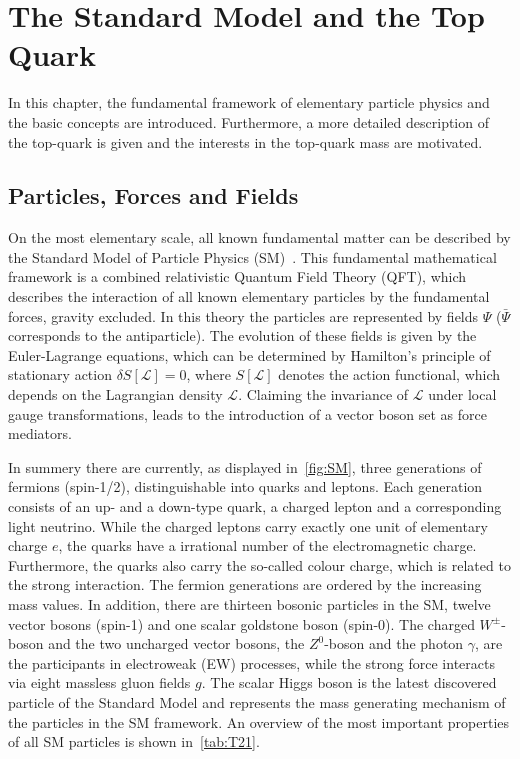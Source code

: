 \chapter{The Standard Model and the Top Quark}
\label{sec:SM1}
In this chapter, the fundamental framework of elementary particle physics and the basic concepts are introduced. Furthermore, a more detailed  description of the top-quark is given and the interests in the top-quark mass are motivated.  

\section{Particles, Forces and Fields}\label{key:SM 2}


\clearpage


On the most elementary scale, all known fundamental matter can be described by the Standard Model of Particle Physics (SM)~\cite{Glashow:1961tr,Glashow:1970gm,Gross:1973ju,Politzer:1973fx,Politzer:1974fr,Salam:1964ry,Weinberg:1967tq}. This fundamental mathematical framework is a combined relativistic Quantum Field Theory (QFT), which describes the interaction of all known elementary particles by the fundamental forces, gravity excluded.
In this theory the particles are represented by fields $\Psi$ ($\bar{\Psi}$  corresponds to the antiparticle). The evolution of these fields is given by the Euler-Lagrange equations, which can be determined by Hamilton's principle of stationary action $\delta S[\mathscr{L}] \!= 0 $, where $S[\mathscr{L}] $ denotes the action functional, which depends on the Lagrangian density $\mathscr{L} $. Claiming the invariance of
$\mathscr{L}$ under local gauge transformations, leads to the introduction of a  vector boson set as force mediators.

 In summery there are currently, as displayed in~\cref{fig:SM}, three generations of fermions (spin-1/2), distinguishable into quarks and leptons. Each generation consists of an up- and a down-type quark, a charged lepton and a corresponding light neutrino. While the charged leptons carry exactly one unit of elementary charge $e$, the quarks have  a irrational number of the electromagnetic charge. Furthermore, the quarks also carry the so-called colour charge, which is related to the strong interaction. The fermion generations are ordered by the increasing mass values.
In addition, there are thirteen bosonic particles in the SM, twelve vector bosons (spin-1) and one scalar goldstone boson (spin-0).
 The charged $W^{\pm}$-boson and the two uncharged vector bosons, the $Z^0$-boson and the photon $ \gamma$, are the participants in electroweak (EW) processes, while the strong force interacts via eight massless gluon fields $g$. The scalar Higgs boson is the latest discovered particle of the Standard Model and represents the mass generating mechanism of the particles in the SM framework. An overview of the most important properties of all SM particles is shown in~\cref{tab:T21}. 
 

